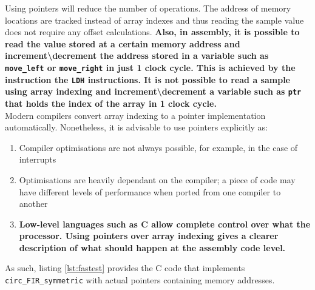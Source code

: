 \documentclass{article}
\begin{document}
Using pointers will reduce the number of operations. The address of memory locations are tracked instead of array indexes and thus reading the sample value does not require any offset calculations. \textbf{Also, in assembly, it is possible to read the value stored at a certain memory address and increment\textbackslash decrement the address stored in a variable such as {\tt *move\_left} or {\tt *move\_right} in just 1 clock cycle. This is achieved by the instruction the {\tt LDH} instructions. It is not possible to read a sample using array indexing and increment\textbackslash decrement a variable such as {\tt ptr} that holds the index of the array in 1 clock cycle.}\\

Modern compilers convert array indexing to a pointer implementation automatically. Nonetheless, it is advisable to use pointers explicitly as:
\begin{enumerate}
    \item Compiler optimisations are not always possible, for example, in the case of interrupts
    \item Optimisations are heavily dependant on the compiler; a piece of code may have different levels of performance when ported from one compiler to another
    \item \textbf{Low-level languages such as C allow complete control over what the processor. Using pointers over array indexing gives a clearer description of what should happen at the assembly code level.}
\end{enumerate}

As such, listing \ref{lst:fastest} provides the C code that implements {\tt circ\_FIR\_symmetric} with actual pointers containing memory addresses. 
\end{document}
